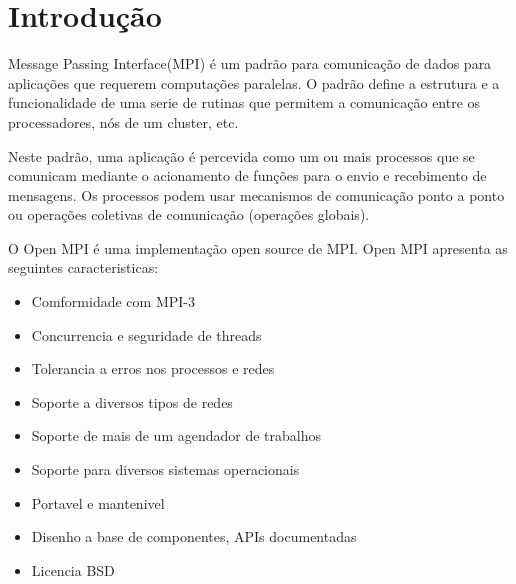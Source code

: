 \section{Introdução}
Message Passing Interface(MPI) é um padrão para comunicação de dados para aplicações que requerem computações paralelas. O padrão define a estrutura e a funcionalidade de uma serie de rutinas que permitem a comunicação entre os processadores, nós de um cluster, etc. 

Neste padrão, uma aplicação é percevida como um ou mais processos que se comunicam mediante o acionamento de funções para o envio e recebimento de mensagens. Os processos podem usar mecanismos de comunicação ponto a ponto ou operações coletivas de comunicação (operações globais).

O Open MPI é uma implementação open source de MPI. Open MPI apresenta as seguintes caracteristicas:
\begin{itemize}
	\item Comformidade com MPI-3
	\item Concurrencia e seguridade de threads
	\item Tolerancia a erros nos processos e redes
	\item Soporte a diversos tipos de redes
	\item Soporte de mais de um agendador de trabalhos
	\item Soporte para diversos sistemas operacionais
	\item Portavel e mantenivel
	\item Disenho a base de componentes, APIs documentadas
	\item Licencia BSD 
\end{itemize}

\clearpage

